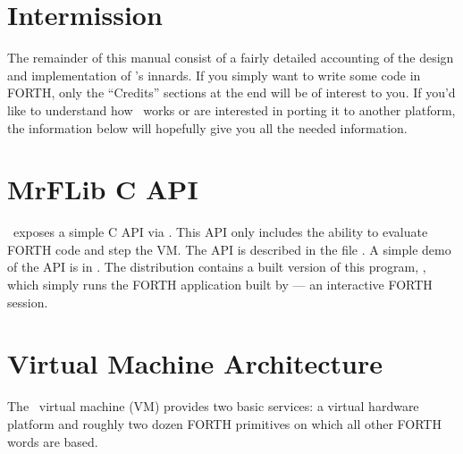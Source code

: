 \documentclass{article}
\begin{document}
\section*{Intermission}

The remainder of this manual consist of a fairly detailed accounting of
the design and implementation of \M's innards. If you simply want to
write some code in FORTH, only the ``Credits'' sections
at the end will be of interest to you. If you'd like to understand how
\M\ works or are interested in porting it to another platform, the
information below will hopefully give you all the needed information.

\section*{MrFLib C API}

\M\ exposes a simple C API via . This API only
includes the ability to evaluate FORTH code and step the VM. The API
is described in the file . A simple demo of the
API is in . The distribution contains a built
version of this program, , which simply runs the FORTH
application built by  --- an interactive FORTH session.

\section*{Virtual Machine Architecture}

The \M\  virtual machine (VM) provides two basic services: a
virtual hardware platform and roughly two dozen FORTH primitives
on which all other FORTH words are based.
\end{document}

